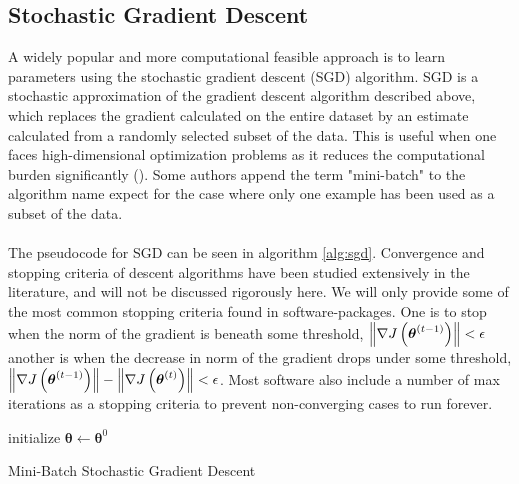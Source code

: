 \subsection{Stochastic Gradient Descent} \label{sec:sgd}
A widely popular and more computational feasible approach is to learn parameters using the stochastic gradient descent (SGD) algorithm. SGD is a stochastic approximation of the gradient descent algorithm described above, which replaces the gradient calculated on the entire dataset by an estimate calculated from a randomly selected subset of the data. This is useful when one faces high-dimensional optimization problems as it reduces the computational burden significantly (\cite{bottou2008tradeoffs}). Some authors append the term "mini-batch" to the algorithm name expect for the case where only one example has been used as a subset of the data.\\
\\
The pseudocode for SGD can be seen in algorithm \ref{alg:sgd}. Convergence and stopping criteria of descent algorithms have been studied extensively in the literature, and will not be discussed rigorously here. We will only provide some of the  most common stopping criteria found in software-packages. One is to stop when the norm of the gradient is beneath some threshold, $\left\lVert\nabla J \left (\boldsymbol{\theta}^{(t-1)}\right)\right\rVert < \epsilon$ another is when the decrease in norm of the gradient drops under some threshold, $\left\lVert\nabla J \left (\boldsymbol{\theta}^{(t -1 )}\right)\right\rVert - \left\lVert \nabla J \left (\boldsymbol{\theta}^{(t)}\right)\right\rVert < \epsilon$. Most software also include a number of max iterations as a stopping criteria to prevent non-converging cases to run forever.\\
\begin{algorithm} \label{alg:sgd}
    \SetAlgoLined
    initialize $\boldsymbol{\theta}\leftarrow \boldsymbol{\theta}^0$ \\
     \caption{Mini-Batch Stochastic Gradient Descent}
\end{algorithm}

